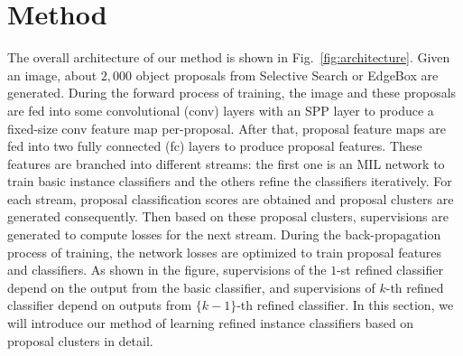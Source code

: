 \documentclass[10pt,journal,compsoc]{IEEEtran}
\begin{document}
\section{Method}
\label{sec:method}

The overall architecture of our method is shown in Fig.~\ref{fig:architecture}.
Given an image, about $2,000$ object proposals from Selective Search \cite{Ref:Uijlings2013} or EdgeBox \cite{Ref:Zitnick2014} are generated.
{During the forward process of training,
the image and these proposals are fed into some convolutional (conv) layers with an SPP layer \cite{Ref:He2015} to produce a fixed-size conv feature map per-proposal.
After that, proposal feature maps are fed into two fully connected (fc) layers to produce proposal features.
These features are branched into different streams:
the first one is an MIL network to train basic instance classifiers and the others refine the classifiers iteratively.
For each stream, proposal classification scores are obtained and proposal clusters are generated consequently.
Then based on these proposal clusters,
supervisions are generated to compute losses for the next stream.
During the back-propagation process of training,
the network losses are optimized to train proposal features and classifiers.}
As shown in the figure, supervisions of the $1$-st refined classifier depend on the output from the basic classifier,
and supervisions of $k$-th refined classifier depend on outputs from $\{k-1\}$-th refined classifier.
In this section, we will introduce our method of learning refined instance classifiers based on proposal clusters in detail.
\end{document}
